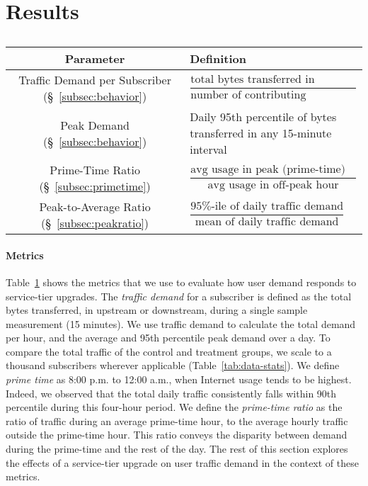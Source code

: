 \section{Results}\label{sec:analysis}

\begin{table}[t]
\centering
\begin{small}
\begin{tabular}{| c | p{2.44in} |}\hline
\textbf{Parameter} & \textbf{Definition}	\\\hline
Traffic Demand per Subscriber (\S~\ref{subsec:behavior})	& \(\dfrac{\text{total bytes transferred in 
measurement int.}}{\text{number of contributing subscribers}}\)	\\
Peak Demand (\S~\ref{subsec:behavior})			& Daily 95th percentile of bytes transferred in any 
15-minute interval \\ 
Prime-Time Ratio (\S~\ref{subsec:primetime}) 	& \( \dfrac{ \text{avg usage in peak (prime-time) 
hour}}{ \text{avg usage in off-peak hour}}\) 		\\
Peak-to-Average Ratio (\S~\ref{subsec:peakratio}) 	& \(\dfrac{\text{95\%-ile of daily traffic 
demand}}{\text{mean of daily traffic demand}}\)	\\\hline
\end{tabular}
\end{small}
\caption{}
\label{tab:eval-criteria}
\end{table}

\paragraph{Metrics}
Table~\ref{tab:eval-criteria} shows the metrics that we use to evaluate
how user demand responds to service-tier upgrades. The \emph{traffic
  demand} for a subscriber is defined as the total bytes transferred, in
upstream or downstream, during a single sample measurement (15 minutes).
We use traffic demand to calculate the total demand per hour, and the
average and 95th percentile peak demand over a day. To compare the total
traffic of the control and treatment groups, we scale to a thousand
subscribers wherever applicable (Table~\ref{tab:data-stats}).  We
define \emph{prime time} as 8:00 p.m. to 12:00 a.m., when Internet usage
tends to be highest.  Indeed, we
observed that the total daily traffic consistently falls within 90th percentile
during this four-hour period. We define the \emph{prime-time ratio} as
the ratio of traffic during an average prime-time hour, to the average
hourly traffic outside the prime-time hour.  This ratio conveys the
disparity between demand during the prime-time and the rest of the day.
The rest of this section explores the effects of a service-tier upgrade
on user traffic demand in the context of these metrics.









%